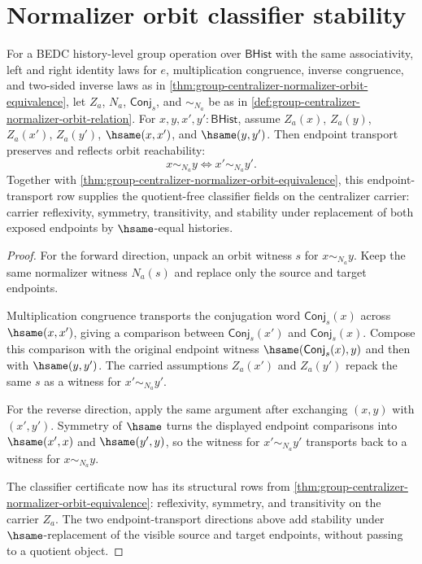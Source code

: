 \section{Normalizer orbit classifier stability}
\label{sec:group-normalizer-orbit-classifier-stability}

\begin{theorem}
\label{thm:group-centralizer-normalizer-orbit-classifier-certificate}
For a BEDC history-level group operation over $\mathsf{BHist}$ with the same
associativity, left and right identity laws for $e$, multiplication
congruence, inverse congruence, and two-sided inverse laws as in
\autoref{thm:group-centralizer-normalizer-orbit-equivalence}, let $Z_a$,
$N_a$, $\mathsf{Conj}_s$, and $\sim_{N_a}$ be as in
\autoref{def:group-centralizer-normalizer-orbit-relation}. For
$x,y,x',y':\mathsf{BHist}$, assume $Z_a(x)$, $Z_a(y)$, $Z_a(x')$,
$Z_a(y')$, $\hsame(x,x')$, and $\hsame(y,y')$. Then endpoint transport
preserves and reflects orbit reachability:
$$
x\sim_{N_a}y
\Longleftrightarrow
x'\sim_{N_a}y'.
$$
Together with
\autoref{thm:group-centralizer-normalizer-orbit-equivalence}, this
endpoint-transport row supplies the quotient-free classifier fields on the
centralizer carrier: carrier reflexivity, symmetry, transitivity, and
stability under replacement of both exposed endpoints by $\hsame$-equal
histories.
\end{theorem}
\begin{proof}
For the forward direction, unpack an orbit witness $s$ for
$x\sim_{N_a}y$. Keep the same normalizer witness $N_a(s)$ and replace only the
source and target endpoints.

Multiplication congruence transports the conjugation word
$\mathsf{Conj}_s(x)$ across $\hsame(x,x')$, giving a comparison between
$\mathsf{Conj}_s(x')$ and $\mathsf{Conj}_s(x)$. Compose this comparison with
the original endpoint witness $\hsame(\mathsf{Conj}_s(x),y)$ and then with
$\hsame(y,y')$. The carried assumptions $Z_a(x')$ and $Z_a(y')$ repack the
same $s$ as a witness for $x'\sim_{N_a}y'$.

For the reverse direction, apply the same argument after exchanging
$(x,y)$ with $(x',y')$. Symmetry of $\hsame$ turns the displayed endpoint
comparisons into $\hsame(x',x)$ and $\hsame(y',y)$, so the witness for
$x'\sim_{N_a}y'$ transports back to a witness for $x\sim_{N_a}y$.

The classifier certificate now has its structural rows from
\autoref{thm:group-centralizer-normalizer-orbit-equivalence}: reflexivity,
symmetry, and transitivity on the carrier $Z_a$. The two endpoint-transport
directions above add stability under $\hsame$-replacement of the visible
source and target endpoints, without passing to a quotient object.
\end{proof}
